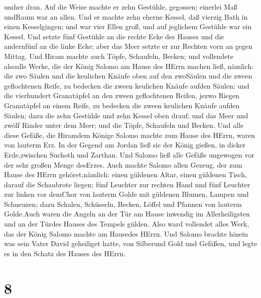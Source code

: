 umher dran.  Auf die Weise machte er zehn Gestühle,
gegossen; einerlei Maß undRaum war an allen.  Und er machte
zehn eherne Kessel, daß vierzig Bath in einen Kesselgingen; und war vier
Ellen groß, und auf jeglichem Gestühle war ein Kessel.  Und
setzte fünf Gestühle an die rechte Ecke des Hauses und die andernfünf an
die linke Ecke; aber das Meer setzte er zur Rechten vorn an gegen
Mittag.  Und Hiram machte auch Töpfe, Schaufeln, Becken;
und vollendete alsoalle Werke, die der König Salomo am Hause des HErrn
machen ließ,  nämlich: die zwo Säulen und die keulichen
Knäufe oben auf den zwoSäulen und die zween geflochtenen Reife, zu
bedecken die zween keulichen Knäufe aufden Säulen;  und die
vierhundert Granatäpfel an den zween geflochtenen Reifen, jezwo Riegen
Granatäpfel an einem Reife, zu bedecken die zween keulichen Knäufe
aufden Säulen;  dazu die zehn Gestühle und zehn Kessel oben
drauf;  und das Meer und zwölf Rinder unter dem Meer;
 und die Töpfe, Schaufeln und Becken. Und alle diese
Gefäße, die Hiramdem Könige Salomo machte zum Hause des HErrn, waren von
lauterm Erz.  In der Gegend am Jordan ließ sie der König
gießen, in dicker Erde,zwischen Suchoth und Zarthan.  Und
Salomo ließ alle Gefäße ungewogen vor der sehr großen Menge desErzes.
 Auch machte Salomo allen Gezeug, der zum Hause des HErrn
gehöret,nämlich: einen güldenen Altar, einen güldenen Tisch, darauf die
Schaubrote liegen;  fünf Leuchter zur rechten Hand und fünf
Leuchter zur linken vor demChor von lauterm Golde mit güldenen Blumen,
Lampen und Schneuzen;  dazu Schalen, Schüsseln, Becken,
Löffel und Pfannen von lauterm Golde.Auch waren die Angeln an der Tür am
Hause inwendig im Allerheiligsten und an der Türdes Hauses des Tempels
gülden.  Also ward vollendet alles Werk, das der König
Salomo machte am Hausedes HErrn. Und Salomo brachte hinein was sein
Vater David geheiliget hatte, von Silberund Gold und Gefäßen, und legte
es in den Schatz des Hauses des HErrn.

\hypertarget{section-7}{%
\section{8}\label{section-7}}

